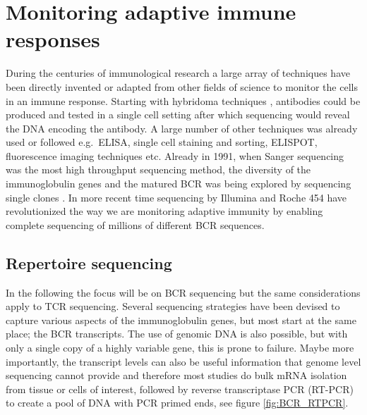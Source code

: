\section{Monitoring adaptive immune responses}
During the centuries of immunological research a large array of techniques have been directly invented or adapted from other fields of science to monitor the cells in an immune response.
Starting with hybridoma techniques \cite{larrick1989polymemse}, antibodies could be produced and tested in a single cell setting after which sequencing would reveal the DNA encoding the antibody.
A large number of other techniques was already used or followed e.g.\ ELISA, single cell staining and sorting, ELISPOT, fluorescence imaging techniques etc.
Already in 1991, when Sanger sequencing was the most high throughput sequencing method, the diversity of the immunoglobulin genes and the matured BCR was being explored by sequencing single clones \cite{yamada1991preferential}.
In more recent time sequencing by Illumina and Roche 454 have revolutionized the way we are monitoring adaptive immunity by enabling complete sequencing of millions of different BCR sequences.


\subsection{Repertoire sequencing}
In the following the focus will be on BCR sequencing but the same considerations apply to TCR sequencing.
Several sequencing strategies have been devised to capture various aspects of the immunoglobulin genes, but most start at the same place; the BCR transcripts.
The use of genomic DNA is also possible, but with only a single copy of a highly variable gene, this is prone to failure.
Maybe more importantly, the transcript levels can also be useful information that genome level sequencing cannot provide and therefore most studies do bulk mRNA isolation from tissue or cells of interest, followed by reverse transcriptase PCR (RT-PCR) to create a pool of DNA with PCR primed ends, see figure \ref{fig:BCR_RTPCR}.

